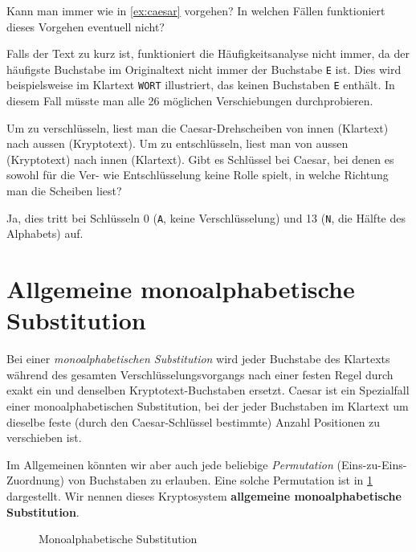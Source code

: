 \begin{myexercise}
	Kann man immer wie in \cref{ex:caesar} vorgehen? In welchen Fällen funktioniert dieses Vorgehen eventuell nicht?
	\begin{myanswer}
		Falls der Text zu kurz ist, funktioniert die Häufigkeitsanalyse nicht immer, da der häufigste Buchstabe im Originaltext nicht immer der Buchstabe \texttt{E} ist. Dies wird beispielsweise im Klartext \texttt{WORT} illustriert, das keinen Buchstaben \texttt{E} enthält. In diesem Fall müsste man alle 26 möglichen Verschiebungen durchprobieren.
	\end{myanswer}
\end{myexercise}

\begin{mychallenge}
	Um zu verschlüsseln, liest man die Caesar-Drehscheiben von innen (Klartext) nach aussen (Kryptotext). Um zu entschlüsseln, liest man von aussen (Kryptotext) nach innen (Klartext). Gibt es Schlüssel bei Caesar, bei denen es sowohl für die Ver- wie Entschlüsselung keine Rolle spielt, in welche Richtung man die Scheiben liest?
	\begin{myanswer}
		Ja, dies tritt bei Schlüsseln 0 (\texttt{A}, keine Verschlüsselung) und 13 (\texttt{N}, die Hälfte des Alphabets) auf.
	\end{myanswer}
\end{mychallenge}


\section{Allgemeine monoalphabetische Substitution}
Bei einer \emph{monoalphabetischen Substitution} wird jeder Buchstabe des Klartexts während des gesamten Verschlüsselungsvorgangs nach einer festen Regel durch exakt ein und denselben Kryptotext-Buchstaben ersetzt.
Caesar ist ein Spezialfall einer monoalphabetischen Substitution, bei der jeder Buchstaben im Klartext um dieselbe feste (durch den Caesar-Schlüssel bestimmte) Anzahl Positionen zu verschieben ist.

Im Allgemeinen könnten wir aber auch jede beliebige \emph{Permutation} (Eins-zu-Eins-Zuordnung) von Buchstaben zu erlauben. Eine solche Permutation ist in \cref{fig:monoalph-subst} dargestellt. Wir nennen dieses Kryptosystem \textbf{allgemeine monoalphabetische Substitution}.
\begin{figure}[H]
	\centering
	\caption{Monoalphabetische Substitution}
	\label{fig:monoalph-subst}
\end{figure}

